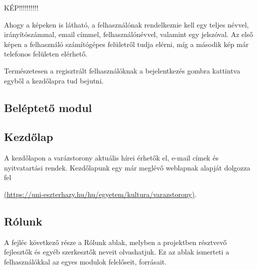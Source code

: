 \documentclass[
]{thesis-ekf}
\theoremstyle{definition}
\theoremstyle{remark}
\begin{document}
			
			\par KÉP!!!!!!!!!!
			
			\par Ahogy a képeken is látható, a felhasználónak rendelkeznie kell egy teljes névvel, irányítószámmal, email címmel, felhasználónévvel, valamint egy jelszóval. Az első képen a felhasználó számítógépes felületről tudja elérni, míg a második kép már telefonos felületen elérhető.
			\par Természetesen a regisztrált felhasználóknak a bejelentkezés gombra kattintva egyből a kezdőlapra tud bejutni.
			
			
			
		\subsection{Beléptető modul}
		\subsection{Kezdőlap}
			A kezdőlapon a varázstorony aktuális hírei érhetők el, e-mail címek és nyitvatartási rendek. Kezdőlapunk egy már meglévő weblapnak alapját dolgozza fel
			\par \url{(https://uni-eszterhazy.hu/hu/egyetem/kultura/varazstorony)}.
		\subsection{Rólunk}
			\par A fejléc következő része a Rólunk ablak, melyben a projektben résztvevő fejlesztők és egyéb szerkesztők neveit olvashatjuk. Ez az ablak ismerteti a felhasználókkal az egyes modulok felelőseit, forrásait.
\end{document}
